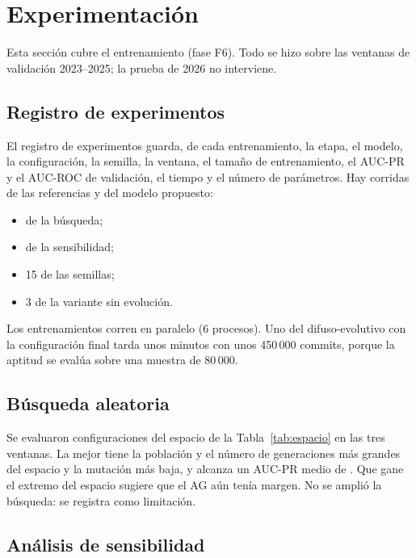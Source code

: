 \section{Experimentación}

Esta sección cubre el entrenamiento (fase F6). Todo se hizo sobre las ventanas de validación 2023--2025; la prueba de 2026 no interviene.

\subsection{Registro de experimentos}

El registro de experimentos guarda, de cada entrenamiento, la etapa, el modelo, la configuración, la semilla, la ventana, el tamaño de entrenamiento, el AUC-PR y el AUC-ROC de validación, el tiempo y el número de parámetros. Hay \cifRegReferencias{} corridas de las referencias y \cifRegPropuesto{} del modelo propuesto:
\begin{itemize}
\item \cifRegBusq{} de la búsqueda;
\item \cifRegSens{} de la sensibilidad;
\item 15 de las semillas;
\item 3 de la variante sin evolución.
\end{itemize}
Los entrenamientos corren en paralelo (6 procesos). Uno del difuso-evolutivo con la configuración final tarda unos \cifTiempoFE{} minutos con unos 450\,000 commits, porque la aptitud se evalúa sobre una muestra de 80\,000.

\subsection{Búsqueda aleatoria}

Se evaluaron \cifNBusqueda{} configuraciones del espacio de la Tabla~\ref{tab:espacio} en las tres ventanas. La mejor tiene la población y el número de generaciones más grandes del espacio y la mutación más baja, y alcanza un AUC-PR medio de \cifMejorBusqueda{}. Que gane el extremo del espacio sugiere que el AG aún tenía margen. No se amplió la búsqueda: se registra como limitación.


\subsection{Análisis de sensibilidad}

